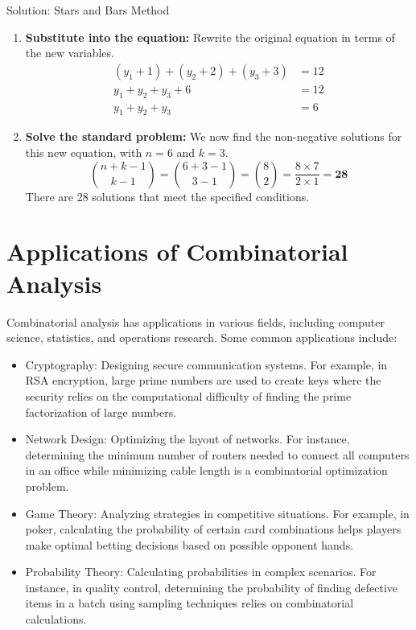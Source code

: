 \begin{solutionboxbreak}{Solution: Stars and Bars Method}
\begin{enumerate}
    \item \textbf{Substitute into the equation:} Rewrite the original equation in terms of the new variables.
    \begin{align*}
        (y_1+1) + (y_2+2) + (y_3+3) &= 12 \\
        y_1 + y_2 + y_3 + 6 &= 12 \\
        y_1 + y_2 + y_3 &= 6
    \end{align*}
    
    \item \textbf{Solve the standard problem:} We now find the non-negative solutions for this new equation, with $n=6$ and $k=3$.
    \[
    \binom{n+k-1}{k-1} = \binom{6+3-1}{3-1} = \binom{8}{2} = \frac{8 \times 7}{2 \times 1} = \mathbf{28}
    \]
    There are 28 solutions that meet the specified conditions.
\end{enumerate}
\end{solutionboxbreak}









\section{Applications of Combinatorial Analysis}
Combinatorial analysis has applications in various fields, including computer science, statistics, and operations research. Some common applications include:
\begin{itemize}
    \item Cryptography: Designing secure communication systems. For example, in RSA encryption, large prime numbers are used to create keys where the security relies on the computational difficulty of finding the prime factorization of large numbers.
    
    \item Network Design: Optimizing the layout of networks. For instance, determining the minimum number of routers needed to connect all computers in an office while minimizing cable length is a combinatorial optimization problem.
    
    \item Game Theory: Analyzing strategies in competitive situations. For example, in poker, calculating the probability of certain card combinations helps players make optimal betting decisions based on possible opponent hands.
    
    \item Probability Theory: Calculating probabilities in complex scenarios. For instance, in quality control, determining the probability of finding defective items in a batch using sampling techniques relies on combinatorial calculations.
\end{itemize}
